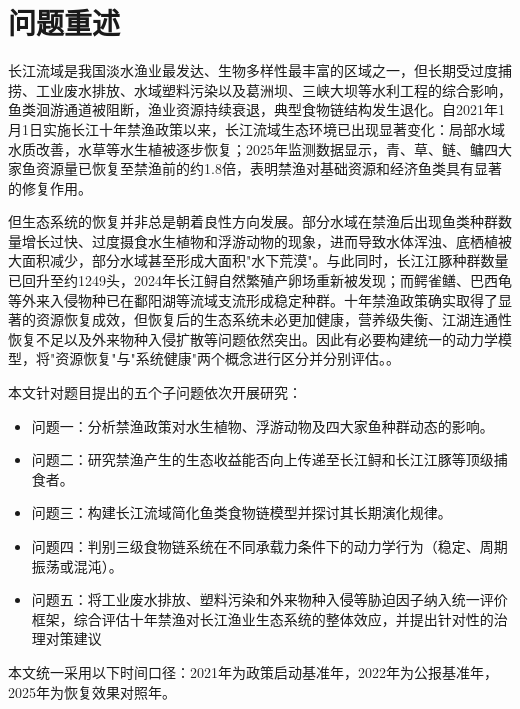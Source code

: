 \section{问题重述}
长江流域是我国淡水渔业最发达、生物多样性最丰富的区域之一，但长期受过度捕捞、工业废水排放、水域塑料污染以及葛洲坝、三峡大坝等水利工程的综合影响，鱼类洄游通道被阻断，渔业资源持续衰退，典型食物链结构发生退化。自2021年1月1日实施长江十年禁渔政策以来，长江流域生态环境已出现显著变化：局部水域水质改善，水草等水生植被逐步恢复；2025年监测数据显示，青、草、鲢、鳙四大家鱼资源量已恢复至禁渔前的约1.8倍，表明禁渔对基础资源和经济鱼类具有显著的修复作用。

但生态系统的恢复并非总是朝着良性方向发展。部分水域在禁渔后出现鱼类种群数量增长过快、过度摄食水生植物和浮游动物的现象，进而导致水体浑浊、底栖植被大面积减少，部分水域甚至形成大面积"水下荒漠"。与此同时，长江江豚种群数量已回升至约1249头，2024年长江鲟自然繁殖产卵场重新被发现；而鳄雀鳝、巴西龟等外来入侵物种已在鄱阳湖等流域支流形成稳定种群。十年禁渔政策确实取得了显著的资源恢复成效，但恢复后的生态系统未必更加健康，营养级失衡、江湖连通性恢复不足以及外来物种入侵扩散等问题依然突出。因此有必要构建统一的动力学模型，将"资源恢复"与"系统健康"两个概念进行区分并分别评估。\cite{report2022,report2023}。

本文针对题目提出的五个子问题依次开展研究：
\begin{itemize}
\item 问题一：分析禁渔政策对水生植物、浮游动物及四大家鱼种群动态的影响。
\item 问题二：研究禁渔产生的生态收益能否向上传递至长江鲟和长江江豚等顶级捕食者。
\item 问题三：构建长江流域简化鱼类食物链模型并探讨其长期演化规律。
\item 问题四：判别三级食物链系统在不同承载力条件下的动力学行为（稳定、周期振荡或混沌）。
\item 问题五：将工业废水排放、塑料污染和外来物种入侵等胁迫因子纳入统一评价框架，综合评估十年禁渔对长江渔业生态系统的整体效应，并提出针对性的治理对策建议
\end{itemize}
本文统一采用以下时间口径：2021年为政策启动基准年，2022年为公报基准年，2025年为恢复效果对照年\cite{yangtzeA}。

